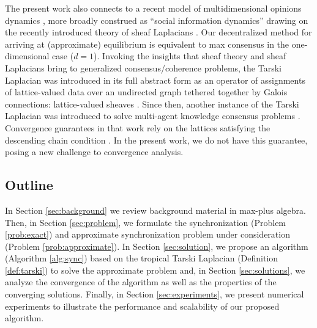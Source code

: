\documentclass[letterpaper, 10 pt, conference]{ieeeconf}
\begin{document}
The present work also connects to a recent model of multidimensional opinions dynamics \cite{hasnen2021}, more broadly construed as ``social information dynamics'' \cite{riess2022,ghirst2022} drawing on the recently introduced theory of sheaf Laplacians \cite{hansen2019}. Our decentralized method for arriving at (approximate) equilibrium is equivalent to max consensus \cite{nejad2009} in the one-dimensional case ($d =1$). Invoking the insights that sheaf theory \cite{curry2014} and sheaf Laplacians \cite{hansen2019} bring to generalized consensus/coherence problems, the Tarski Laplacian was introduced in its full abstract form \cite{riess2022b} as an operator of assignments of lattice-valued data over an undirected graph tethered together by Galois connections: lattice-valued sheaves \cite{ghrist2022}. Since then, another instance of the Tarski Laplacian was introduced to solve multi-agent knowledge consensus problems \cite{riess2022}. Convergence guarantees in that work \cite{riess2022} rely on the lattices satisfying the descending chain condition \cite{roman2008}. In the present work, we do not have this guarantee, posing a new challenge to convergence analysis.


\subsection{Outline}
\label{sec:outline}

In Section \ref{sec:background} we review background material in max-plus algebra. Then, in Section \ref{sec:problem}, we formulate the synchronization (Problem \ref{prob:exact}) and approximate synchronization problem under consideration (Problem \ref{prob:approximate}). In Section \ref{sec:solution}, we propose an algorithm (Algorithm \ref{alg:sync}) based on the tropical Tarski Laplacian (Definition \ref{def:tarski}) to solve the approximate problem and, in Section \ref{sec:solutions}, we analyze the convergence of the algorithm as well as the properties of the converging solutions. Finally, in Section \ref{sec:experiments}, we present numerical experiments to illustrate the performance and scalability of our proposed algorithm.
\end{document}

